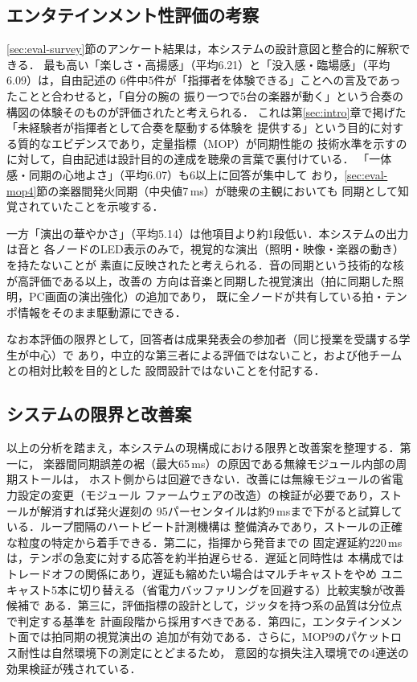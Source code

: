 \documentclass[uplatex,dvipdfmx]{jlreq}
\begin{document}
\subsection{エンタテインメント性評価の考察}\label{sec:disc-survey}

\ref{sec:eval-survey}節のアンケート結果は，本システムの設計意図と整合的に解釈できる．
最も高い「楽しさ・高揚感」（平均6.21）と「没入感・臨場感」（平均6.09）は，自由記述の
6件中5件が「指揮者を体験できる」ことへの言及であったことと合わせると，「自分の腕の
振り一つで5台の楽器が動く」という合奏の構図の体験そのものが評価されたと考えられる．
これは第\ref{sec:intro}章で掲げた「未経験者が指揮者として合奏を駆動する体験を
提供する」という目的に対する質的なエビデンスであり，定量指標（MOP）が同期性能の
技術水準を示すのに対して，自由記述は設計目的の達成を聴衆の言葉で裏付けている．
「一体感・同期の心地よさ」（平均6.07）も6以上に回答が集中して
おり，\ref{sec:eval-mop4}節の楽器間発火同期（中央値7\,ms）が聴衆の主観においても
同期として知覚されていたことを示唆する．

一方「演出の華やかさ」（平均5.14）は他項目より約1段低い．本システムの出力は音と
各ノードのLED表示のみで，視覚的な演出（照明・映像・楽器の動き）を持たないことが
素直に反映されたと考えられる．音の同期という技術的な核が高評価である以上，改善の
方向は音楽と同期した視覚演出（拍に同期した照明，PC画面の演出強化）の追加であり，
既に全ノードが共有している拍・テンポ情報をそのまま駆動源にできる．

なお本評価の限界として，回答者は成果発表会の参加者（同じ授業を受講する学生が中心）で
あり，中立的な第三者による評価ではないこと，および他チームとの相対比較を目的とした
設問設計ではないことを付記する．

\subsection{システムの限界と改善案}\label{sec:disc-limit}

以上の分析を踏まえ，本システムの現構成における限界と改善案を整理する．第一に，
楽器間同期誤差の裾（最大65\,ms）の原因である無線モジュール内部の周期ストールは，
ホスト側からは回避できない．改善には無線モジュールの省電力設定の変更（モジュール
ファームウェアの改造）の検証が必要であり，ストールが解消すれば発火遅刻の
95パーセンタイルは約9\,msまで下がると試算している．ループ間隔のハートビート計測機構は
整備済みであり，ストールの正確な粒度の特定から着手できる．第二に，指揮から発音までの
固定遅延約220\,msは，テンポの急変に対する応答を約半拍遅らせる．遅延と同時性は
本構成ではトレードオフの関係にあり，遅延も縮めたい場合はマルチキャストをやめ
ユニキャスト5本に切り替える（省電力バッファリングを回避する）比較実験が改善候補で
ある．第三に，評価指標の設計として，ジッタを持つ系の品質は分位点で判定する基準を
計画段階から採用すべきである．第四に，エンタテインメント面では拍同期の視覚演出の
追加が有効である．さらに，MOP9のパケットロス耐性は自然環境下の測定にとどまるため，
意図的な損失注入環境での4連送の効果検証が残されている．
\end{document}
